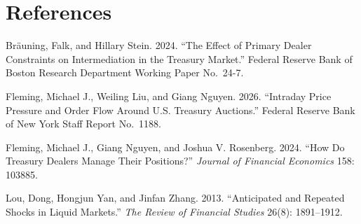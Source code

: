 \documentclass[12pt]{article}
\begin{document}
\newpage
\section*{References}
\begin{list}{}{%
  \setlength{\leftmargin}{1.5em}\setlength{\itemindent}{-1.5em}
  \setlength{\itemsep}{0.6em}\setlength{\parsep}{0pt}}

\item Br\"auning, Falk, and Hillary Stein. 2024. ``The Effect of Primary Dealer Constraints on Intermediation in the Treasury Market.'' Federal Reserve Bank of Boston Research Department Working Paper No.~24-7.

\item Fleming, Michael J., Weiling Liu, and Giang Nguyen. 2026. ``Intraday Price Pressure and Order Flow Around U.S. Treasury Auctions.'' Federal Reserve Bank of New York Staff Report No.~1188.

\item Fleming, Michael J., Giang Nguyen, and Joshua V. Rosenberg. 2024. ``How Do Treasury Dealers Manage Their Positions?'' \textit{Journal of Financial Economics} 158: 103885.

\item Lou, Dong, Hongjun Yan, and Jinfan Zhang. 2013. ``Anticipated and Repeated Shocks in Liquid Markets.'' \textit{The Review of Financial Studies} 26(8): 1891--1912.

\end{list}
\end{document}
